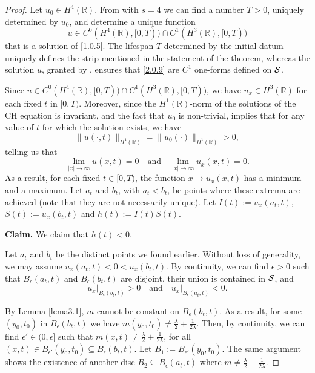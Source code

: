 \documentclass{cimart}
\begin{document}
\begin{proof}
    Let $u_0\in H^4(\mathbb{R})$. From \cite[Proposition 2.7]{const1998-1} with $s=4$ we can find a number $T>0$, uniquely determined by $u_0$, and determine a unique function \[u\in C^{0}(H^{4}(\mathbb{R}),[0,T))\cap C^{1}(H^{3}(\mathbb{R}),[0,T))\] that is a solution of \eqref{1.0.5}. The lifespan $T$ determined by the initial datum uniquely defines the strip mentioned in the statement of the theorem, whereas the solution $u$, granted by \cite[Proposition 2.7]{const1998-1}, ensures that \eqref{2.0.9} are $C^1$ one-forms defined on ${\cal S}$.

    Since $u\in C^{0}(H^{4}(\mathbb{R}),[0,T))\cap C^{1}(H^{3}(\mathbb{R}),[0,T))$, we have $u_x\in H^3(\mathbb{R})$ for each fixed $t$ in $[0,T)$. Moreover, since the $H^1(\mathbb{R})$-norm of the solutions of the CH equation is invariant, and the fact that $u_0$ is non-trivial, implies that for any value of $t$ for which the solution exists, we have
    \begin{equation}\label{3.0.1}
    \|u(\cdot,t)\|_{H^1(\mathbb{R})}=\|u_0(\cdot)\|_{H^1(\mathbb{R})}>0,
    \end{equation}
    telling us that
    \begin{equation}\label{3.0.2}
    \lim_{|x|\rightarrow\infty}u(x,t)=0\quad\text{and}\quad\lim_{|x|\rightarrow\infty}u_x(x,t)=0.
    \end{equation}
    As a result, for each fixed $t\in[0,T)$, the function $x\mapsto u_x(x,t)$ has a minimum and a maximum. Let $a_t$ and $b_t$, with $a_t<b_t$, be points where these extrema are achieved (note that they are not necessarily unique). Let $I(t):=u_x(a_t,t)$, $S(t):=u_x(b_t,t)$ and $h(t):=I(t)S(t)$.

    \textbf{Claim.} We claim that $h(t)<0$.

    Let $a_t$ and $b_t$ be the distinct points we found earlier. Without loss of generality, we may assume $u_x(a_t,t)<0<u_x(b_t,t)$. By continuity, we can find $\epsilon>0$ such that $B_\epsilon(a_t,t)$ and $B_\epsilon(b_t,t)$ are disjoint, their union is contained in ${\cal S}$, and
    $$u_x\Big|_{B_\epsilon(b_t,t)}>0\quad\text{and}\quad u_x\Big|_{B_\epsilon(a_t,t)}<0.$$

    By Lemma \ref{lema3.1}, $m$ cannot be constant on $B_\epsilon(b_t,t)$. As a result, for some $(y_0,t_0)$ in $B_\epsilon(b_t,t)$ we have $m(y_0,t_0)\neq \frac{\lambda}{2}+\frac{1}{2\lambda}$. Then, by continuity, we can find $\epsilon'\in(0,\epsilon]$ such that $m(x,t)\neq \frac{\lambda}{2}+\frac{1}{2\lambda}$, for all $(x,t)\in B_{\epsilon'}(y_0,t_0)\subseteq B_\epsilon(b_t,t)$. Let $B_1:=B_{\epsilon'}(y_0,t_0)$. The same argument shows the existence of another disc $B_2\subseteq B_\epsilon(a_t,t)$ where $m\neq \frac{\lambda}{2}+\frac{1}{2\lambda}$.


\end{proof}
\end{document}
